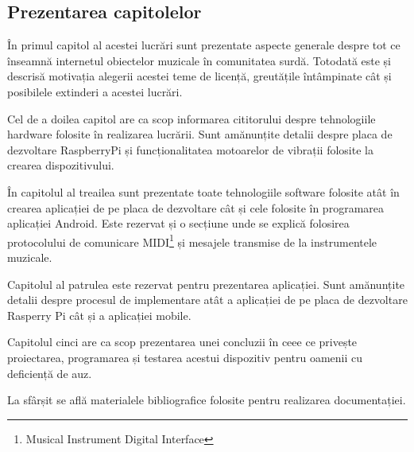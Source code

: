 \documentclass[../IoMusT.tex]{subfiles}
\begin{document}
\subsection{Prezentarea capitolelor}
În primul capitol al acestei lucrări sunt prezentate aspecte generale des\-pre tot ce înseamnă internetul obiectelor muzicale în comunitatea surdă. Tot\-o\-da\-tă este și descrisă motivația alegerii acestei teme de licență, greutățile întâmpinate cât și posibilele extinderi a acestei lucrări.
\\
\par Cel de a doilea capitol are ca scop informarea cititorului despre tehnologiile hardware folosite în realizarea lucrării. Sunt amănunțite detalii despre placa de dezvoltare RaspberryPi și funcționalitatea motoarelor de vibrații folosite la crearea dispozitivului.
\\
\par În capitolul al treailea sunt prezentate toate tehnologiile software folosite atât în crearea aplicației de pe placa de dezvoltare cât și cele folosite în programarea aplicației Android. Este rezervat și o secțiune unde se explică folosirea protocolului de comunicare MIDI\footnote{Musical Instrument Digital Interface} și mesajele transmise de la instrumentele muzicale.
\\
\par Capitolul al patrulea este rezervat pentru prezentarea aplicației. Sunt amănunțite detalii despre procesul de implementare atât a aplicației de pe placa de dezvoltare Rasperry Pi cât și a aplicației mobile.
\\
\par Capitolul cinci are ca scop prezentarea unei concluzii în ceee ce privește proiectarea, programarea și testarea acestui dispozitiv pentru oamenii cu deficiență de auz.
\\
\par La sfârșit se află materialele bibliografice folosite pentru realizarea do\-cu\-men\-ta\-ți\-ei.
\end{document}
